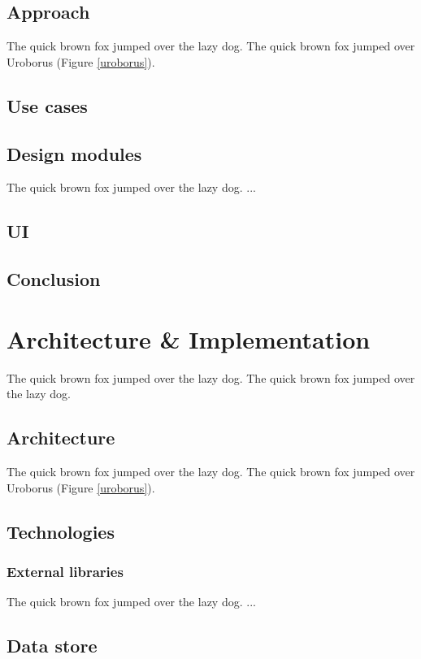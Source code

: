 \documentclass{l4proj}
\begin{document}
\section{Approach}
The quick brown fox jumped over the lazy dog.
The quick brown fox jumped over Uroborus (Figure \ref{uroborus}).

\section{Use cases}

\section{Design modules}
The quick brown fox jumped over the lazy dog.
...

\section{UI}

\section{Conclusion}

\chapter{Architecture & Implementation}
The quick brown fox jumped over the lazy dog.
The quick brown fox jumped over the lazy dog.

\section{Architecture}
The quick brown fox jumped over the lazy dog.
The quick brown fox jumped over Uroborus (Figure \ref{uroborus}).

\section{Technologies}

\subsection{External libraries}
The quick brown fox jumped over the lazy dog.
...

\section{Data store}
\end{document}
